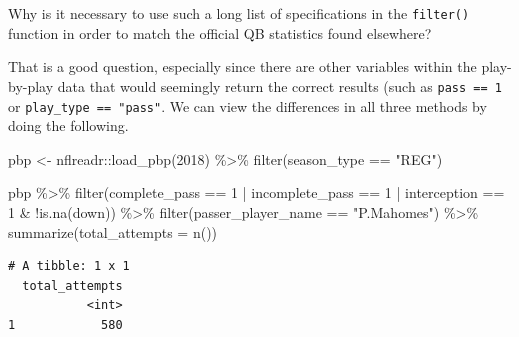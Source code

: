 \documentclass[
  letterpaper,
]{krantz}
\newenvironment{Shaded}{\begin{snugshade}}{\end{snugshade}}
\newcommand{\AttributeTok}[1]{\textcolor[rgb]{0.40,0.45,0.13}{#1}}
\newcommand{\DecValTok}[1]{\textcolor[rgb]{0.68,0.00,0.00}{#1}}
\newcommand{\FunctionTok}[1]{\textcolor[rgb]{0.28,0.35,0.67}{#1}}
\newcommand{\NormalTok}[1]{\textcolor[rgb]{0.00,0.23,0.31}{#1}}
\newcommand{\OtherTok}[1]{\textcolor[rgb]{0.00,0.23,0.31}{#1}}
\newcommand{\SpecialCharTok}[1]{\textcolor[rgb]{0.37,0.37,0.37}{#1}}
\newcommand{\StringTok}[1]{\textcolor[rgb]{0.13,0.47,0.30}{#1}}
\begin{document}
\begin{tcolorbox}[enhanced jigsaw, colback=white, leftrule=.75mm, breakable, colframe=quarto-callout-tip-color-frame, bottomtitle=1mm, rightrule=.15mm, left=2mm, opacityback=0, bottomrule=.15mm, arc=.35mm, coltitle=black, colbacktitle=quarto-callout-tip-color!10!white, toptitle=1mm, titlerule=0mm, title=\textcolor{quarto-callout-tip-color}{\faLightbulb}\hspace{0.5em}{Tip}, toprule=.15mm, opacitybacktitle=0.6]

Why is it necessary to use such a long list of specifications in the
\texttt{filter()} function in order to match the official QB statistics
found elsewhere?

That is a good question, especially since there are other variables
within the play-by-play data that would seemingly return the correct
results (such as \texttt{pass\ ==\ 1} or
\texttt{play\_type\ ==\ "pass"}. We can view the differences in all
three methods by doing the following.

\begin{Shaded}
\begin{Highlighting}[]
\NormalTok{pbp }\OtherTok{\textless{}{-}}\NormalTok{ nflreadr}\SpecialCharTok{::}\FunctionTok{load\_pbp}\NormalTok{(}\DecValTok{2018}\NormalTok{) }\SpecialCharTok{\%\textgreater{}\%}
  \FunctionTok{filter}\NormalTok{(season\_type }\SpecialCharTok{==} \StringTok{"REG"}\NormalTok{)}

\NormalTok{pbp }\SpecialCharTok{\%\textgreater{}\%}
  \FunctionTok{filter}\NormalTok{(complete\_pass }\SpecialCharTok{==} \DecValTok{1} \SpecialCharTok{|}\NormalTok{ incomplete\_pass }\SpecialCharTok{==} \DecValTok{1} \SpecialCharTok{|}
\NormalTok{           interception }\SpecialCharTok{==} \DecValTok{1} \SpecialCharTok{\&}
           \SpecialCharTok{!}\FunctionTok{is.na}\NormalTok{(down)) }\SpecialCharTok{\%\textgreater{}\%}
  \FunctionTok{filter}\NormalTok{(passer\_player\_name }\SpecialCharTok{==} \StringTok{"P.Mahomes"}\NormalTok{) }\SpecialCharTok{\%\textgreater{}\%}
  \FunctionTok{summarize}\NormalTok{(}\AttributeTok{total\_attempts =} \FunctionTok{n}\NormalTok{())}
\end{Highlighting}
\end{Shaded}

\begin{verbatim}
# A tibble: 1 x 1
  total_attempts
           <int>
1            580
\end{verbatim}


\end{tcolorbox}
\end{document}
